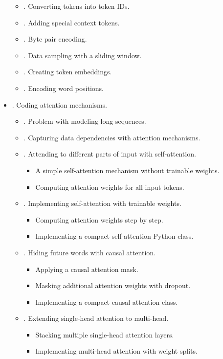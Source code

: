 \documentclass{article}
\begin{document}
\begin{itemize}
\begin{itemize}
		\item {. Converting tokens into token IDs.}
		\item {. Adding special context tokens.}
		\item {. Byte pair encoding.}
		\item {. Data sampling with a sliding window.}
		\item {. Creating token embeddings.}
		\item {. Encoding word positions.}
	\end{itemize}
	\item {. Coding attention mechanisms.}
	\begin{itemize}
		\item {. Problem with modeling long sequences.}
		\item {. Capturing data dependencies with attention mechanisms.}
		\item {. Attending to different parts of input with self-attention.}
		\begin{itemize}
			\item {\sf A simple self-attention mechanism without trainable weights.}
			\item {\sf Computing attention weights for all input tokens.}
		\end{itemize}
		\item {. Implementing self-attention with trainable weights.}
		\begin{itemize}
			\item {\sf Computing attention weights step by step.}
			\item {\sf Implementing a compact self-attention Python class.}
		\end{itemize}
		\item {. Hiding future words with causal attention.}
		\begin{itemize}
			\item {\sf Applying a causal attention mask.}
			\item {\sf Masking additional attention weights with dropout.}
			\item {\sf Implementing a compact causal attention class.}
		\end{itemize}
		\item {. Extending single-head attention to multi-head.}
		\begin{itemize}
			\item {\sf Stacking multiple single-head attention layers.}
			\item {\sf Implementing multi-head attention with weight splits.}

\end{itemize}
\end{itemize}
\end{itemize}
\end{document}
